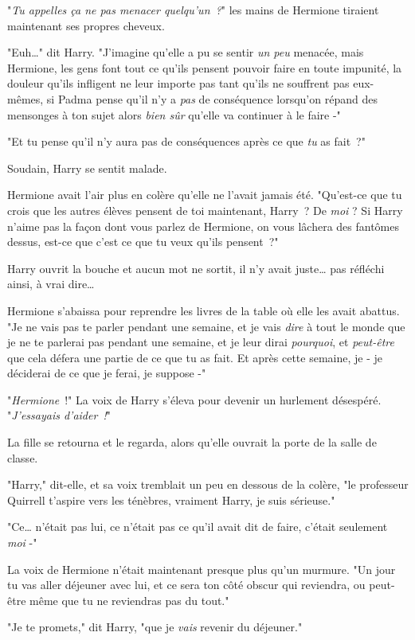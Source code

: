 "\emph{Tu appelles ça ne pas menacer quelqu'un~?}" les mains de Hermione tiraient maintenant ses propres cheveux.

"Euh…" dit Harry. "J'imagine qu'elle a pu se sentir \emph{un peu} menacée, mais Hermione, les gens font tout ce qu'ils pensent pouvoir faire en toute impunité, la douleur qu'ils infligent ne leur importe pas tant qu'ils ne souffrent pas eux-mêmes, si Padma pense qu'il n'y a \emph{pas} de conséquence lorsqu'on répand des mensonges à ton sujet alors \emph{bien sûr} qu'elle va continuer à le faire -"

"Et tu pense qu'il n'y aura pas de conséquences après ce que \emph{tu} as fait~?"

Soudain, Harry se sentit malade.

Hermione avait l'air plus en colère qu'elle ne l'avait jamais été. "Qu'est-ce que tu crois que les autres élèves pensent de toi maintenant, Harry~? De \emph{moi} ? Si Harry n'aime pas la façon dont vous parlez de Hermione, on vous lâchera des fantômes dessus, est-ce que c'est ce que tu veux qu'ils pensent~?"

Harry ouvrit la bouche et aucun mot ne sortit, il n'y avait juste… pas réfléchi ainsi, à vrai dire…

Hermione s'abaissa pour reprendre les livres de la table où elle les avait abattus. "Je ne vais pas te parler pendant une semaine, et je vais \emph{dire} à tout le monde que je ne te parlerai pas pendant une semaine, et je leur dirai \emph{pourquoi}, et \emph{peut-être} que cela défera une partie de ce que tu as fait. Et après cette semaine, je - je déciderai de ce que je ferai, je suppose -"

"\emph{Hermione}~!" La voix de Harry s'éleva pour devenir un hurlement désespéré. "\emph{J'essayais d'aider~!}"

La fille se retourna et le regarda, alors qu'elle ouvrait la porte de la salle de classe.

"Harry," dit-elle, et sa voix tremblait un peu en dessous de la colère, "le professeur Quirrell t'aspire vers les ténèbres, vraiment Harry, je suis sérieuse."

"Ce… n'était pas lui, ce n'était pas ce qu'il avait dit de faire, c'était seulement \emph{moi} -"

La voix de Hermione n'était maintenant presque plus qu'un murmure. "Un jour tu vas aller déjeuner avec lui, et ce sera ton côté obscur qui reviendra, ou peut-être même que tu ne reviendras pas du tout."

"Je te promets," dit Harry, "que je \emph{vais} revenir du déjeuner."

